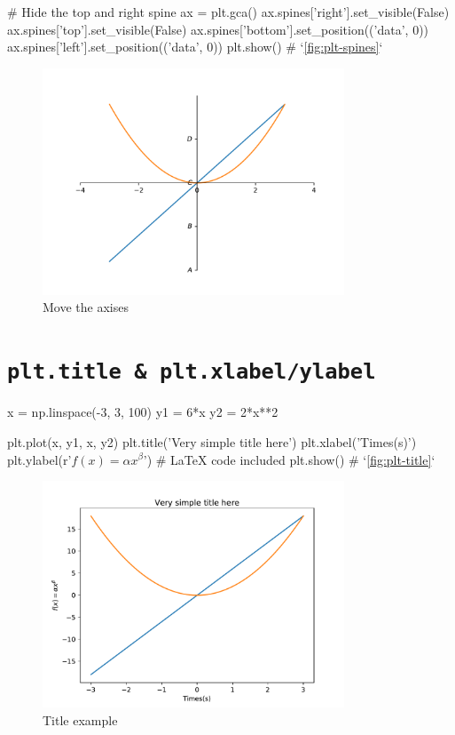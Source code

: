 \documentclass{report}
\begin{document}
\begin{py}
# Hide the top and right spine
ax = plt.gca()
ax.spines['right'].set_visible(False)
ax.spines['top'].set_visible(False)
ax.spines['bottom'].set_position(('data', 0))
ax.spines['left'].set_position(('data', 0))
plt.show() # `\autoref{fig:plt-spines}`
\end{py}

\begin{figure}[!htb]
  \centering
  \includegraphics[width=90mm]{plt-spines}
  \caption{Move the axises}
  \label{fig:plt-spines}
\end{figure}

\section{\texttt{plt.title \& plt.xlabel/ylabel}}
\begin{py}
x = np.linspace(-3, 3, 100)
y1 = 6*x
y2 = 2*x**2

plt.plot(x, y1, x, y2)
plt.title('Very simple title here')
plt.xlabel('Times(s)')
plt.ylabel(r'$f(x)=\alpha x^{\beta}$') # LaTeX code included
plt.show() # `\autoref{fig:plt-title}`
\end{py}

\begin{figure}[!htb]
  \centering
  \includegraphics[width=90mm]{plt-title}
  \caption{Title example}
  \label{fig:plt-title}
\end{figure}
\end{document}
